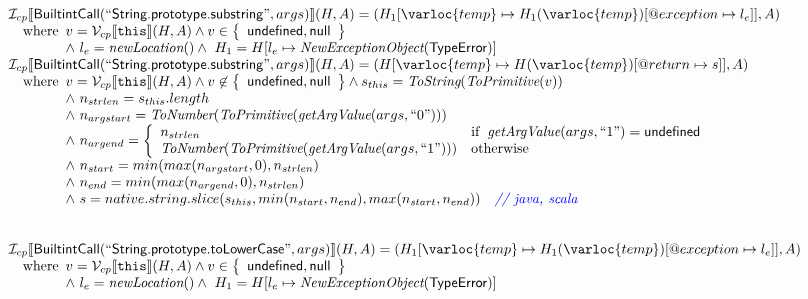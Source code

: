 \[
\begin{array}{l}
\I _{cp}\lbr \SF{BuiltintCall}(``\SF{String.prototype.substring}",args)\rbr(H,A)
 = (H_1[\varloc{temp}\mapsto H_1(\varloc{temp})[\varprop{exception}\mapsto l_e]], A) \\
\quad\wherec{
  v = \V _{cp}\lbr \TT{this}\rbr (H,A) \land v \in \set{\SF{undefined}, \SF{null}}\\
  \land\ l_e = \hf{newLocation}() \land\ H_1=H[l_e\mapsto\hf{NewExceptionObject}(\SF{TypeError})] 
  }\\
  
\I _{cp}\lbr \SF{BuiltintCall}(``\SF{String.prototype.substring}",args)\rbr(H,A)
 = (H[\varloc{temp}\mapsto H(\varloc{temp})[\varprop{return}\mapsto s]], A) \\
\quad\wherec{
  v = \V _{cp}\lbr \TT{this}\rbr (H,A) \land v \not\in \set{\SF{undefined}, \SF{null}}
  \land s_{this} = \hf{ToString}(\hf{ToPrimitive}(v))\\
  \land\ n_{strlen} = s_{this}.length\\
  \land\ n_{argstart} = \hf{ToNumber}(\hf{ToPrimitive}(\hf{getArgValue}(args, ``0")))\\
  \land\ n_{argend} = \left\{\begin{array}{ll}
      n_{strlen} & \ifc{\hf{getArgValue}(args, ``1") = \SF{undefined}}\\
      \hf{ToNumber}(\hf{ToPrimitive}(\hf{getArgValue}(args, ``1"))) & \owc
    \end{array}\right.\\
  \land\ n_{start} = min(max(n_{argstart},0), n_{strlen})\\
  \land\ n_{end} = min(max(n_{argend},0), n_{strlen})\\
  \land\ s = native.string.slice(s_{this}, min(n_{start},n_{end}), max(n_{start},n_{end})) \quad\comment{{\inblue // java, scala}}\\
  }\\
\\\\


\I _{cp}\lbr \SF{BuiltintCall}(``\SF{String.prototype.toLowerCase}",args)\rbr(H,A)
 = (H_1[\varloc{temp}\mapsto H_1(\varloc{temp})[\varprop{exception}\mapsto l_e]], A) \\
\quad\wherec{
  v = \V _{cp}\lbr \TT{this}\rbr (H,A) \land v \in \set{\SF{undefined}, \SF{null}}\\
  \land\ l_e = \hf{newLocation}() \land\ H_1=H[l_e\mapsto\hf{NewExceptionObject}(\SF{TypeError})] 
  }\\
  

\end{array}\]
